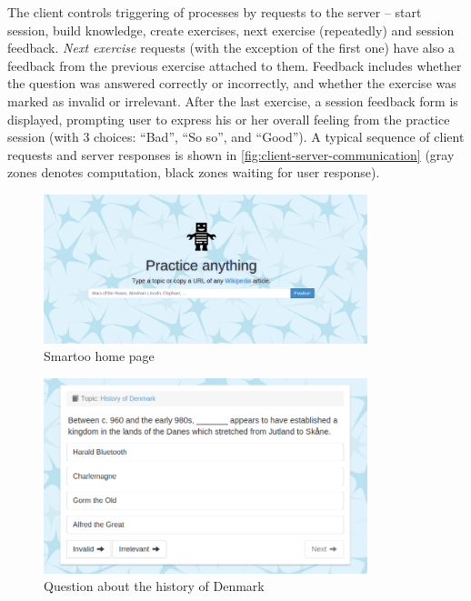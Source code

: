 \documentclass[12pt, twoside]{fithesis2}
\renewcommand{\_}{\leavevmode \kern0.07em\vbox{\hrule width0.4em}}
\newcounter{choice}
\begin{document}
The client controls triggering of processes by requests to the server -- start session, build knowledge, create exercises, next exercise (repeatedly) and session feedback.
\emph{Next exercise} requests (with the exception of the first one) have also a feedback from the previous exercise attached to them.
Feedback includes whether the question was answered correctly or incorrectly, and whether the exercise was marked as invalid or irrelevant.
After the last exercise, a session feedback form is displayed, prompting user to express his or her overall feeling from the practice session (with 3 choices: ``Bad'', ``So so'', and ``Good'').
A typical sequence of client requests and server responses is shown in
\autoref{fig:client-server-communication} (gray zones denotes computation, black zones waiting for user response).

\begin{figure}[h]
  \centering
  \includegraphics[width=0.84\textwidth]{images/home-page.png}
  \caption{Smartoo home page}
  \label{fig:smartoo-home}
\end{figure}

\begin{figure}[h]
  \centering
  \includegraphics[width=0.84\textwidth]{images/question-unanswered.png}
  \caption{Question about the history of Denmark}
  \label{fig:question-unanswered}
\end{figure}
\end{document}
